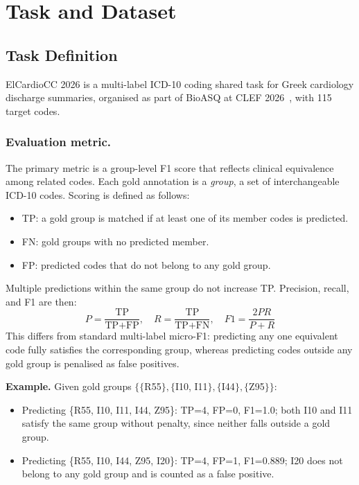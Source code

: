 \section{Task and Dataset}
\label{sec:task}

\subsection{Task Definition}

ElCardioCC 2026 is a multi-label ICD-10 coding shared task for Greek cardiology
discharge summaries, organised as part of BioASQ at CLEF
2026~\cite{BioASQ2026,BioASQ2026ElCardioCC}, with 115 target codes.

\subsubsection{Evaluation metric.}
The primary metric is a group-level F1 score that reflects clinical equivalence among
related codes. Each gold annotation is a \emph{group}, a set of interchangeable
ICD-10 codes. Scoring is defined as follows:
\begin{itemize}
  \item TP: a gold group is matched if at least one of its member codes is predicted.
  \item FN: gold groups with no predicted member.
  \item FP: predicted codes that do not belong to any gold group.
\end{itemize}
Multiple predictions within the same group do not increase TP. Precision, recall, and
F1 are then:
\begin{equation}
P = \frac{\text{TP}}{\text{TP}+\text{FP}}, \quad
R = \frac{\text{TP}}{\text{TP}+\text{FN}}, \quad
F1 = \frac{2PR}{P+R}
\end{equation}
This differs from standard multi-label micro-F1: predicting any one equivalent code
fully satisfies the corresponding group, whereas predicting codes outside any gold group
is penalised as false positives.

\noindent\textbf{Example.}
Given gold groups $\{\{$R55$\}, \{$I10, I11$\}, \{$I44$\}, \{$Z95$\}\}$:
\begin{itemize}
  \item Predicting \{R55, I10, I11, I44, Z95\}: TP=4, FP=0, F1=1.0; both I10 and I11 satisfy
    the same group without penalty, since neither falls outside a gold group.
  \item Predicting \{R55, I10, I44, Z95, I20\}: TP=4, FP=1, F1=0.889; I20 does not belong
    to any gold group and is counted as a false positive.
\end{itemize}

